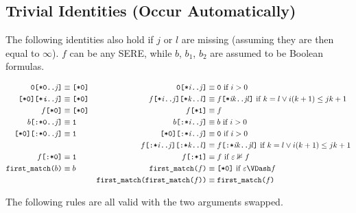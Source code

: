 \documentclass[a4paper,twoside,10pt,DIV=12]{scrreprt}
\newcommand{\FUSION}{\mathbin{\texttt{:}}}
\newcommand{\CONCAT}{\mathbin{\texttt{;}}}
\newcommand{\0}{\texttt{0}}
\newcommand{\1}{\texttt{1}}
\newcommand{\STAR}[1]{\texttt{[*#1]}}
\newcommand{\FSTAR}[1]{\texttt{[:*#1]}}
\newcommand{\FIRSTMATCH}{\texttt{first\_match}}
\newcommand{\eword}{\texttt{[*0]}}
\newcommand\var[1]{{\ttfamily\itshape #1}}
\newcommand\mvar[1]{\ensuremath{\mathit{#1}}}
\newcommand\code[1]{\texttt{#1}}
\newcommand\samp[1]{`\texttt{#1}'}
\begin{document}
\subsection{Trivial Identities (Occur Automatically)}

The following identities also hold if $j$ or $l$ are missing (assuming
they are then equal to $\infty$).  $f$ can be any SERE, while $b$,
$b_1$, $b_2$ are assumed to be Boolean formulas.

\begin{align*}
  \0\STAR{0..\mvar{j}} &\equiv \eword  &
  \0\STAR{\mvar{i}..\mvar{j}} &\equiv \0 \text{~if~}i>0 \\
  \eword\STAR{\var{i}..\mvar{j}} &\equiv \eword&
  f\STAR{\mvar{i}..\mvar{j}}\STAR{\mvar{k}..\mvar{l}} &\equiv f\STAR{\mvar{ik}..\mvar{jl}}\text{~if~}k=l\lor i(k+1)\le jk+1 \\
  f\STAR{0}&\equiv \eword &
  f\STAR{1}&\equiv f\\
  b\FSTAR{0..\mvar{j}} &\equiv \1  &
  b\FSTAR{\mvar{i}..\mvar{j}} &\equiv b \text{~if~}i>0 \\
  \eword\FSTAR{0..\mvar{j}} &\equiv \1&
  \eword\FSTAR{\mvar{i}..\mvar{j}} &\equiv \0\text{~if~}i>0 \\
  &&
  f\FSTAR{\mvar{i}..\mvar{j}}\FSTAR{\mvar{k}..\mvar{l}} &\equiv f\FSTAR{\mvar{ik}..\mvar{jl}}\text{~if~}k=l\lor i(k+1)\le jk+1 \\
  f\FSTAR{0}&\equiv \1 & f\FSTAR{1}&\equiv f\text{~if~}\varepsilon\nVDash f\\
  \FIRSTMATCH\code(b\code) &\equiv b & \FIRSTMATCH\code(f\code) &\equiv \eword\text{~if~}\varepsilon\VDash f \\
                                    && \FIRSTMATCH\code(\FIRSTMATCH\code(f\code)\code) &\equiv \FIRSTMATCH\code(f\code)
\end{align*}

\noindent
The following rules are all valid with the two arguments swapped.
\end{document}
